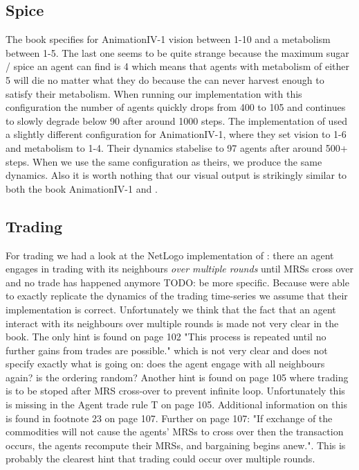 \subsection{Spice}
The book specifies for AnimationIV-1 vision between 1-10 and a metabolism between 1-5. The last one seems to be quite strange because the maximum sugar / spice an agent can find is 4 which means that agents with metabolism of either 5 will die no matter what they do because the can never harvest enough to satisfy their metabolism. When running our implementation with this configuration the number of agents quickly drops from 400 to 105 and continues to slowly degrade below 90 after around 1000 steps.
The implementation of \cite{weaver_replicating_nodate} used a slightly different configuration for AnimationIV-1, where they set vision to 1-6 and metabolism to 1-4. Their dynamics stabelise to 97 agents after around 500+ steps. When we use the same configuration as theirs, we produce the same dynamics.
Also it is worth nothing that our visual output is strikingly similar to both the book AnimationIV-1 and \cite{weaver_replicating_nodate}.

\subsection{Trading}
For trading we had a look at the NetLogo implementation of \cite{weaver_replicating_nodate}: there an agent engages in trading with its neighbours \textit{over multiple rounds} until MRSs cross over and no trade has happened anymore TODO: be more specific. Because \cite{weaver_replicating_nodate} were able to exactly replicate the dynamics of the trading time-series we assume that their implementation is correct. Unfortunately we think that the fact that an agent interact with its neighbours over multiple rounds is made not very clear in the book. The only hint is found on page 102 "This process is repeated until no further gains from trades are possible." which is not very clear and does not specify exactly what is going on: does the agent engage with all neighbours again? is the ordering random? Another hint is found on page 105 where trading is to be stoped after MRS cross-over to prevent infinite loop. Unfortunately this is missing in the Agent trade rule T on page 105. Additional information on this is found in footnote 23 on page 107. Further on page 107: "If exchange of the commodities will not cause the agents' MRSs to cross over then the transaction occurs, the agents recompute their MRSs, and bargaining begins anew.". This is probably the clearest hint that trading could occur over multiple rounds.

